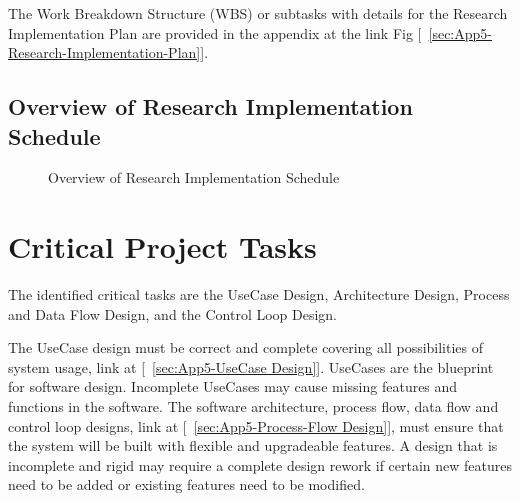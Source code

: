 The Work Breakdown Structure (WBS) or subtasks with details for the Research Implementation Plan are provided in the appendix at the link Fig [~\ref{sec:App5-Research-Implementation-Plan}].


\clearpage
\pagebreak
\begin{landscape}

\section{Overview of Research Implementation Schedule}

\begin{figure}[htbp]
	\begin{center}
		\caption{Overview of Research Implementation Schedule}
		\label{fig:Overview-Research-Implementation-Plan.png}
	\end{center}
\end{figure}

\end{landscape}


\section{Critical Project Tasks} 
The identified critical tasks are the UseCase Design, Architecture Design, Process and Data Flow Design, and the Control Loop Design.
\vspace{0.5cm}

The UseCase design must be correct and complete covering all possibilities of system usage, link at [~\ref{sec:App5-UseCase Design}]. UseCases are the blueprint for software design. Incomplete UseCases may cause missing features and functions in the software. The software architecture, process flow, data flow and control loop designs, link at [~\ref{sec:App5-Process-Flow Design}], must ensure that the system will be built with flexible and upgradeable features. A design that is incomplete and rigid may require a complete design rework if certain new features need to be added or existing features need to be modified.	
\vspace{0.5cm}
	

